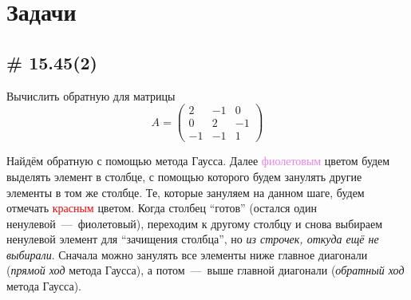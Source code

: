 \documentclass[a4paper,12pt]{article}
\begin{document}
  
  \section{Задачи}
  
  
  \subsection{\# 15.45(2)}
  
  Вычислить обратную для матрицы
  \[
    A = \begin{pmatrix}
      2 & -1 & 0\\
      0 & 2 & -1\\
      -1 & -1 & 1
    \end{pmatrix}
  \]
  
  \begin{solution}
    Найдём обратную с помощью метода Гаусса.
    Далее \textcolor{violet}{фиолетовым} цветом будем выделять элемент в столбце, с помощью которого будем занулять другие элементы в том же столбце.
    Те, которые зануляем на данном шаге, будем отмечать \textcolor{red}{красным} цветом.
    Когда столбец ``готов'' (остался один ненулевой~---~фиолетовый), переходим к другому столбцу и снова выбираем ненулевой элемент для ``зачищения столбца'', но \emph{из строчек, откуда ещё не выбирали}.
    Сначала можно занулять все элементы ниже главное диагонали (\emph{прямой ход} метода Гаусса), а потом~---~выше главной диагонали (\emph{обратный ход} метода Гаусса).
    

\end{solution}
\end{document}
